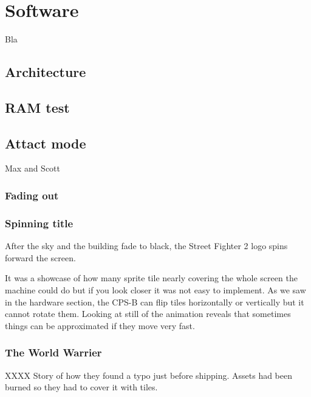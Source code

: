 \chapter{Software} 
Bla
\section{Architecture}

\section{RAM test}

\section{Attact mode}

Max and Scott

\subsection{Fading out}




\subsection{Spinning title}

After the sky and the building fade to black, the Street Fighter 2 logo spins forward the screen. 

It was a showcase of how many sprite tile nearly covering the whole screen the machine could do but if you look closer it was not easy to implement. As we saw in the hardware section, the CPS-B can flip tiles horizontally or vertically but it cannot rotate them. Looking at still of the animation reveals that sometimes things can be approximated if they move very fast.






\subsection{The World Warrier}
\begin{trivia}{XXXX}
Story of how they found a typo just before shipping. Assets had been burned so they had to cover it with tiles.

\end{trivia}
\begin{figure}[H]
\end{figure}
